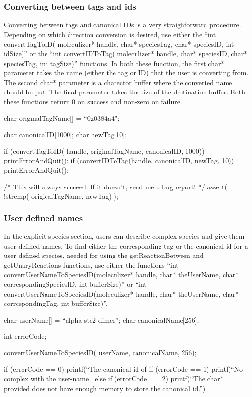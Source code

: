 \subsubsection{Converting between tags and ids}
Converting between tags and canonical IDs is a very straighforward
procedure.  Depending on which direction conversion is desired, use
either the ``int convertTagToID( moleculizer* handle, char*
speciesTag, char* speciesID, int idSize)'' or the ``int
convertIDToTag( moleculizer* handle, char* speciesID, char*
speciesTag, int tagSize)'' functions.  In both these function, the
first char* parameter takes the name (either the tag or ID) that the
user is converting from.  The second char* parameter is a charector
buffer where the converted name should be put.  The final parameter
takes the size of the destination buffer.  Both these functions return
0 on success and non-zero on failure.  

\begin{ExampleC}

char originalTagName[] = ``0x0384a4'';

char canonicalID[1000];
char newTag[10];

if (convertTagToID( handle, originalTagName, canonicalID, 1000)) printErrorAndQuit();
if (convertIDToTag(handle, canonicalID, newTag, 10)) printErrorAndQuit();

/* This will always succeed.  If it doesn't, send me a bug report! */
assert( !strcmp( origicalTagName, newTag) );

\end{ExampleC}

\subsubsection{User defined names}

In the explicit species section, users can describe complex species
and give them user defined names.  To find either the corresponding
tag or the canonical id for a user defined species, needed for using
the getReactionBetween and getUnaryReactions functions, use either the
functions ``int convertUserNameToSpeciesID(moleculizer* handle, char*
theUserName, char* correspondingSpeciesID, int bufferSize)'' or ``int
convertUserNameToSpeciesID(moleculizer* handle, char* theUserName,
char* correspondingTag, int bufferSize)''. 

\begin{ExampleC}[caption=Example usage of convertUserNameToSpeciesID,
  label=userNameCEx]

  char userName[] = ``alpha-ste2 dimer'';
  char canonicalName[256];
  
  int errorCode;

  convertUserNameToSpeciesID( userName, canonicalName, 256);

  if (errorCode == 0) printf(``The canonical id of %
  if (errorCode == 1) printf(``No complex with the user-name '%
  else if (errorCode == 2) printf(``The char* provided does not have
  enough memory to store the canonical id.'');

\end{ExampleC}

